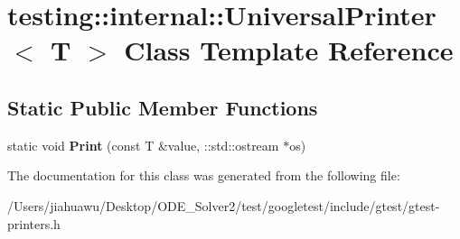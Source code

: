 \hypertarget{classtesting_1_1internal_1_1_universal_printer}{}\section{testing\+:\+:internal\+:\+:Universal\+Printer$<$ T $>$ Class Template Reference}
\label{classtesting_1_1internal_1_1_universal_printer}
\subsection*{Static Public Member Functions}
\begin{DoxyCompactItemize}
\item 
\mbox{\label{classtesting_1_1internal_1_1_universal_printer_aecec021e1abbaa260b701e24e3fe33eb}} 
static void {\bfseries Print} (const T \&value, \+::std\+::ostream $\ast$os)
\end{DoxyCompactItemize}


The documentation for this class was generated from the following file\+:\begin{DoxyCompactItemize}
\item 
/\+Users/jiahuawu/\+Desktop/\+O\+D\+E\+\_\+\+Solver2/test/googletest/include/gtest/gtest-\/printers.\+h\end{DoxyCompactItemize}
